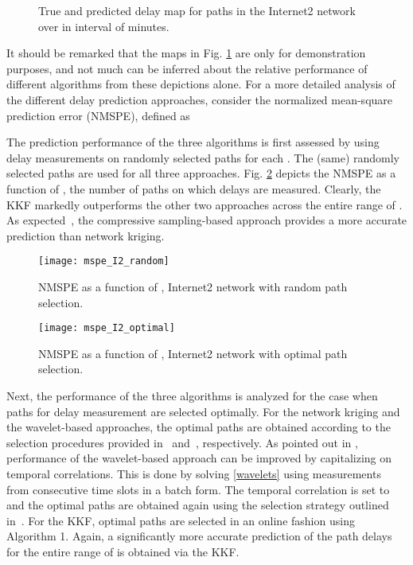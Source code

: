 \documentclass[draftcls,onecolumn,12pt]{IEEEtran}
\newlength \figwidth
\theoremstyle{plain}\newtheorem{thm}{Theorem}
\theoremstyle{definition}
\theoremstyle{remark}
\begin{document}
\begin{figure}
	\centering
     
  \caption{True and predicted delay map for  paths in the Internet2 network over in interval of  minutes.}
  \label{delaymaps}
\end{figure}


{It should be remarked that the maps in Fig. \ref{delaymaps} are only for demonstration purposes, and not much can be inferred about the relative performance of different algorithms from these depictions alone.} For a more detailed analysis of the different delay prediction approaches, consider the normalized mean-square prediction error (NMSPE), defined as
 
The prediction performance of the three algorithms is first assessed by using delay measurements on randomly selected paths for each . The (same) randomly selected paths are used for all three approaches. 
Fig. \ref{mspeI2random} depicts the NMSPE as a function of , the number of paths on which delays are measured. Clearly, the KKF markedly outperforms the other two approaches across the entire range of . As expected~\cite{coates}, the compressive sampling-based approach provides a more accurate prediction than network kriging. 

\begin{figure}[t]
\centering
\texttt{[image: mspe\_I2\_random]}
\caption{NMSPE as a function of , Internet2 network with random path selection.}
\label{mspeI2random}
\end{figure}



\begin{figure}
\centering
\texttt{[image: mspe\_I2\_optimal]}
\caption{NMSPE as a function of , Internet2 network with optimal path selection.}
\label{mspeI2optimal}
\end{figure}




Next, the performance of the three algorithms is analyzed for the case when paths for delay measurement are selected optimally. 
For the network kriging and the wavelet-based approaches, the optimal paths are obtained according to the selection procedures provided in~\cite{nk} and~\cite{coates}, respectively. 
As pointed out in \cite{coates}, performance of the wavelet-based approach can be improved by capitalizing on temporal correlations.
This is done by solving \eqref{wavelets} using measurements from  consecutive time slots in a batch form. 
The temporal correlation is set to  and the optimal paths are obtained again using the selection strategy outlined in~\cite{coates}. 
For the KKF, optimal paths are selected in an online fashion using Algorithm 1.
Again, a significantly more accurate prediction of the path delays for the entire range of  is obtained via the KKF.
\end{document}

